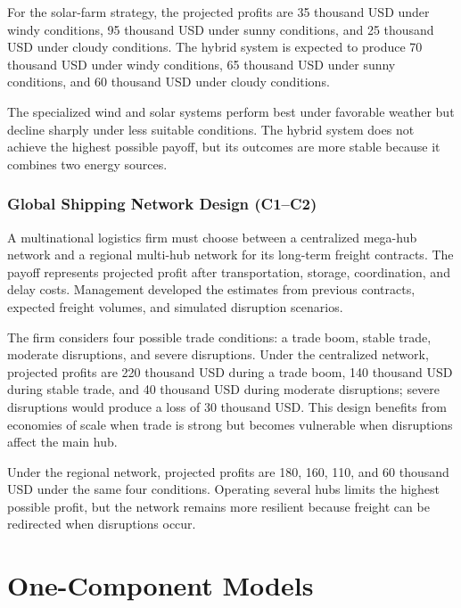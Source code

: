 	For the solar-farm strategy, the projected profits are 35 thousand USD under windy conditions, 95 thousand USD under sunny conditions, and 25 thousand USD under cloudy conditions. The hybrid system is expected to produce 70 thousand USD under windy conditions, 65 thousand USD under sunny conditions, and 60 thousand USD under cloudy conditions.
	
	The specialized wind and solar systems perform best under favorable weather but decline sharply under less suitable conditions. The hybrid system does not achieve the highest possible payoff, but its outcomes are more stable because it combines two energy sources.
	
	\subsubsection{Global Shipping Network Design (C1--C2)}
	\label{sec:problem5-global-shipping-network-design-c1-c2}
	
	A multinational logistics firm must choose between a centralized mega-hub network and a regional multi-hub network for its long-term freight contracts. The payoff represents projected profit after transportation, storage, coordination, and delay costs. Management developed the estimates from previous contracts, expected freight volumes, and simulated disruption scenarios.
	
	The firm considers four possible trade conditions: a trade boom, stable trade, moderate disruptions, and severe disruptions. Under the centralized network, projected profits are 220 thousand USD during a trade boom, 140 thousand USD during stable trade, and 40 thousand USD during moderate disruptions; severe disruptions would produce a loss of 30 thousand USD. This design benefits from economies of scale when trade is strong but becomes vulnerable when disruptions affect the main hub.
	
	Under the regional network, projected profits are 180, 160, 110, and 60 thousand USD under the same four conditions. Operating several hubs limits the highest possible profit, but the network remains more resilient because freight can be redirected when disruptions occur.

	
	\section{One-Component Models}
	\label{sec:one-component-models}

